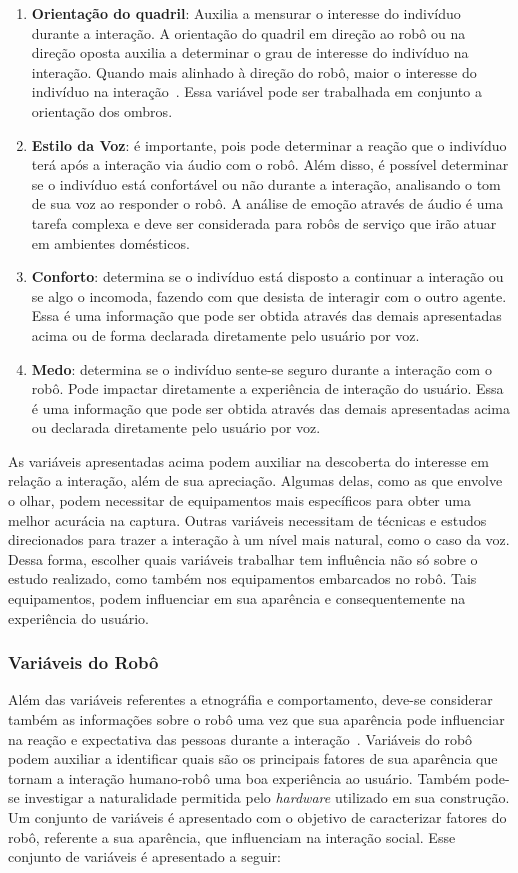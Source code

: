 \begin{enumerate}
    \item \textbf{Orientação do quadril}: Auxilia a mensurar o interesse do indivíduo durante a interação. A orientação do quadril em direção ao robô ou na direção oposta auxilia a determinar o grau de interesse do indivíduo na interação. Quando mais alinhado à direção do robô, maior o interesse do indivíduo na interação~\cite{lambert:2008}. Essa variável pode ser trabalhada em conjunto a orientação dos ombros.
    \item \textbf{Estilo da Voz}: é importante, pois pode determinar a reação que o indivíduo terá após a interação via áudio com o robô. Além disso, é possível determinar se o indivíduo está confortável ou não durante a interação, analisando o tom de sua voz ao responder o robô. A análise de emoção através de áudio é uma tarefa complexa e deve ser considerada para robôs de serviço que irão atuar em ambientes domésticos.
    \item \textbf{Conforto}: determina se o indivíduo está disposto a continuar a interação ou se algo o incomoda, fazendo com que desista de interagir com o outro agente. Essa é uma informação que pode ser obtida através das demais apresentadas acima ou de forma declarada diretamente pelo usuário por voz.
    \item \textbf{Medo}: determina se o indivíduo sente-se seguro durante a interação com o robô. Pode impactar diretamente a experiência de interação do usuário. Essa é uma informação que pode ser obtida através das demais apresentadas acima ou declarada diretamente pelo usuário por voz.
\end{enumerate}

As variáveis apresentadas acima podem auxiliar na descoberta do interesse em relação a interação, além de sua apreciação. Algumas delas, como as que envolve o olhar, podem necessitar de equipamentos mais específicos para obter uma melhor acurácia na captura. Outras variáveis necessitam de técnicas e estudos direcionados para trazer a interação à um nível mais natural, como o caso da voz. Dessa forma, escolher quais variáveis trabalhar tem influência não só sobre o estudo realizado, como também nos equipamentos embarcados no robô. Tais equipamentos, podem influenciar em sua aparência e consequentemente na experiência do usuário.

\subsubsection{Variáveis do Robô}
\label{sec:variaveisrobo}
Além das variáveis referentes a etnográfia e comportamento, deve-se considerar também as informações sobre o robô uma vez que sua aparência pode influenciar na reação e expectativa das pessoas durante a interação~\cite{hegel:2009}. Variáveis do robô podem auxiliar a identificar quais são os principais fatores de sua aparência que tornam a interação humano-robô uma boa experiência ao usuário. Também pode-se investigar a naturalidade permitida pelo \textit{hardware} utilizado em sua construção. Um conjunto de variáveis é apresentado com o objetivo de caracterizar fatores do robô, referente a sua aparência, que influenciam na interação social. Esse conjunto de variáveis é apresentado a seguir:

